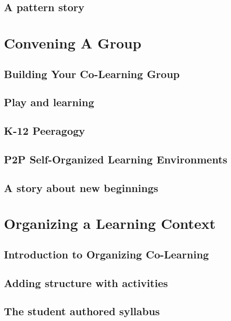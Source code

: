 \documentclass[ebook, 12pt, twoside]{memoir}
\begin{document}
\chapter[\textbf{A pattern story}]{A pattern story}
%



\part{Convening A Group} \label{convening-part} %
%
\chapter[\textbf{Convening}]{Building Your Co-Learning Group}

%
\chapter[\textbf{Play and learning}]{Play and learning}
%

%
\chapter[\textbf{K-12 Peeragogy}]{K-12 Peeragogy}
%

%
\chapter[\textbf{P2P SOLE}]{P2P Self-Organized Learning Environments}
%

%
\chapter[\textbf{A story about new beginnings}]{A story about new beginnings}
%




\part{Organizing a Learning Context} \label{organizing-part} %
%
\chapter[\textbf{Organizing Co-Learning}]{Introduction to Organizing Co-Learning}

%
\chapter[\textbf{Adding structure}]{Adding structure with activities}
%

%
\chapter[\textbf{The student authored syllabus}]{ The student authored syllabus } 
%

%
\end{document}
